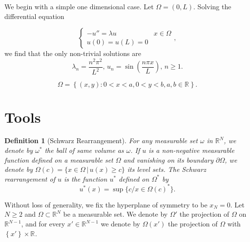 \documentclass[12pt]{report}
\newtheorem{definition}{Definition}
\numberwithin{definition}{section}
\begin{document}


We begin with a simple one dimensional case.
Let $\Omega = (0,L)$.
Solving the differential equation

\[
  \begin{cases}
    -u'' = \lambda u &  x \in \Omega \\
    u(0) = u(L) = 0 & 
  \end{cases}
,\] 
we find that the only non-trivial solutions are 
\[
  \lambda_{n} = \frac{n^2\pi^2}{L^2},\, u_{n} = \sin \left( \frac{n\pi x}{L} \right ),\, n \geq 1
.\] 


\[
\Omega = \left\{ (x,y) : 0 < x < a, 0 < y < b, a,b \in \mathbb{R}^{}  \right\}
.\] 




\break


\section{Tools}

\begin{definition}[Schwarz Rearrangement] \label{schwarz}
  For any measurable set $\omega$ in $\mathbb{R}^{N} $, we denote by $\omega^{*}$ the ball of same volume as $\omega$.
  If $u$ is a non-negative measurable function defined on a measurable set $\Omega$ and vanishing on its boundary $\partial \Omega$,
  we denote by $\Omega(c) = \{ x \in \Omega \,|\, u(x) \geq c \}$ its level sets.
  The Schwarz rearrangement of $u$ is the function $u^{*}$ defined on $\Omega^{*}$ by 
  \[
    u^{*}(x) = \sup\{c / x \in \Omega(c)^{*}\}
  .\] 
  
\end{definition}

Without loss of generality, we fix the hyperplane of symmetry to be $x_{N} = 0$.
Let $N \geq 2$ and $\Omega \subset \mathbb{R}^{N} $ be a measurable set.
We denote by $\Omega'$ the projection of $\Omega$ on $\mathbb{R}^{N-1} $, and for every $x' \in \mathbb{R}^{N-1} $ we denote by $\Omega(x')$ the projection of $\Omega$ with $ \left\{ x' \right\} \times \mathbb{R}^{}  $.
\end{document}
